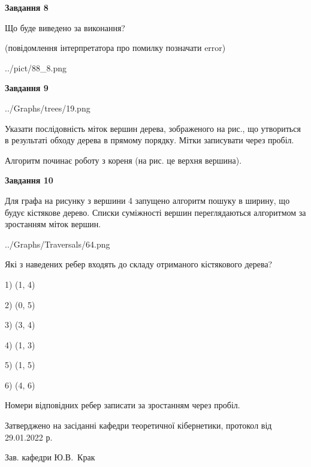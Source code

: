 \documentclass[12pt, ukrainian]{article}
\begin{document}
{\begin {large}
{\begin {center}\textbf{Завдання 8}\end {center}}\par
Що буде виведено за виконання?\par
 (повідомлення інтерпретатора про помилку позначати error)\par
\begin{center}
	{../pict/88_8.png}
\end{center}
\newpage

{\begin {center}\textbf{Завдання 9}\end {center}}\par

\begin{center}
	{../Graphs/trees/19.png}
\end{center}
Указати послідовність міток вершин дерева, зображеного на рис., що утвориться в результаті обходу дерева в прямому порядку. Мітки записувати через пробіл.\par Алгоритм починає роботу з кореня (на рис. це верхня вершина).\par
\newpage

{\begin {center}\textbf{Завдання 10}\end {center}}\par
Для графа на рисунку з вершини 4 запущено алгоритм пошуку в ширину, що будує кістякове дерево. Списки суміжності вершин переглядаються алгоритмом за зростанням міток вершин.\par
\begin{center}
	{../Graphs/Traversals/64.png}
\end{center}
\par Які з наведених ребер входять до складу отриманого кістякового дерева?\par
1) (1, 4)\par
2) (0, 5)\par
3) (3, 4)\par
4) (1, 3)\par
5) (1, 5)\par
6) (4, 6)\par
{\vskip 15pt} Номери відповідних ребер записати за зростанням через пробіл.\par
\newpage


\end {large}
}
{\smallskip \begin {small} Затверджено на засіданні кафедри теоретичної кібернетики, протокол  від   29.01.2022 р.\par\smallskip\smallskip
{\parbox {6.5 cm}{Зав. кафедри \dotfill Ю.В.~Крак}} \end{small}}
\end{document}
